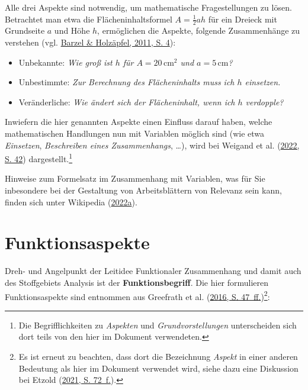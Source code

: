 \documentclass[
]{scrbook}
\providecommand{\tightlist}{%
  \setlength{\itemsep}{0pt}\setlength{\parskip}{0pt}}
\theoremstyle{definition}
\theoremstyle{definition}
\theoremstyle{definition}
\theoremstyle{definition}
\theoremstyle{remark}
\begin{document}
Alle drei Aspekte sind notwendig, um mathematische Fragestellungen zu lösen. Betrachtet man etwa die Flächeninhaltsformel \(A = \frac{1}{2}ah\) für ein Dreieck mit Grundseite \(a\) und Höhe \(h\), ermöglichen die Aspekte, folgende Zusammenhänge zu verstehen (vgl. \protect\hyperlink{ref-Barzel2011a}{Barzel \& Holzäpfel, 2011, S. 4}):

\begin{itemize}
\tightlist
\item
  Unbekannte: \emph{Wie groß ist \(h\) für \(A= 20\,\mathrm{cm}^2\) und \(a = 5\,\mathrm{cm}\)?}
\item
  Unbestimmte: \emph{Zur Berechnung des Flächeninhalts muss ich \(h\) einsetzen.}
\item
  Veränderliche: \emph{Wie ändert sich der Flächeninhalt, wenn ich \(h\) verdopple?}
\end{itemize}

Inwiefern die hier genannten Aspekte einen Einfluss darauf haben, welche mathematischen Handlungen nun mit Variablen möglich sind (wie etwa \emph{Einsetzen}, \emph{Beschreiben eines Zusammenhangs}, \ldots), wird bei Weigand et al. (\protect\hyperlink{ref-Weigand2022}{2022, S. 42}) dargestellt.\footnote{Die Begrifflichkeiten zu \emph{Aspekten} und \emph{Grundvorstellungen} unterscheiden sich dort teils von den hier im Dokument verwendeten.}

Hinweise zum Formelsatz im Zusammenhang mit Variablen, was für Sie inbesondere bei der Gestaltung von Arbeitsblättern von Relevanz sein kann, finden sich unter Wikipedia (\protect\hyperlink{ref-dewiki:225284496}{2022a}).

\hypertarget{funktionsaspekte}{%
\section{Funktionsaspekte}\label{funktionsaspekte}}

Dreh- und Angelpunkt der Leitidee Funktionaler Zusammenhang und damit auch des Stoffgebiets Analysis ist der \textbf{Funktionsbegriff}. Die hier formulieren Funktionsaspekte sind entnommen aus Greefrath et al. (\protect\hyperlink{ref-Greefrath2016}{2016, S. 47~ff.})\footnote{Es ist erneut zu beachten, dass dort die Bezeichnung \emph{Aspekt} in einer anderen Bedeutung als hier im Dokument verwendet wird, siehe dazu eine Diskussion bei Etzold (\protect\hyperlink{ref-Etzold2021}{2021, S. 72~f.}).}:
\end{document}

